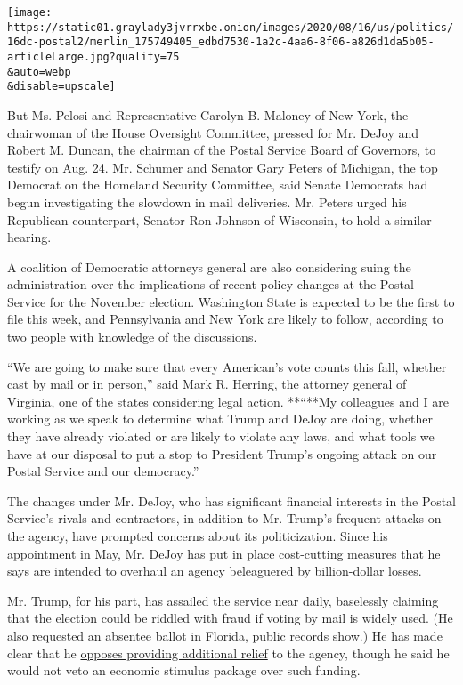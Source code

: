 \texttt{[image: https://static01.graylady3jvrrxbe.onion/images/2020/08/16/us/politics/16dc-postal2/merlin\_175749405\_edbd7530-1a2c-4aa6-8f06-a826d1da5b05-articleLarge.jpg?quality=75\\\&auto=webp\\\&disable=upscale]}

But Ms. Pelosi and Representative Carolyn B. Maloney of New York, the
chairwoman of the House Oversight Committee, pressed for Mr. DeJoy and
Robert M. Duncan, the chairman of the Postal Service Board of Governors,
to testify on Aug. 24. Mr. Schumer and Senator Gary Peters of Michigan,
the top Democrat on the Homeland Security Committee, said Senate
Democrats had begun investigating the slowdown in mail deliveries. Mr.
Peters urged his Republican counterpart, Senator Ron Johnson of
Wisconsin, to hold a similar hearing.

A coalition of Democratic attorneys general are also considering suing
the administration over the implications of recent policy changes at the
Postal Service for the November election. Washington State is expected
to be the first to file this week, and Pennsylvania and New York are
likely to follow, according to two people with knowledge of the
discussions.

``We are going to make sure that every American's vote counts this fall,
whether cast by mail or in person,'' said Mark R. Herring, the attorney
general of Virginia, one of the states considering legal action.
**``**My colleagues and I are working as we speak to determine what
Trump and DeJoy are doing, whether they have already violated or are
likely to violate any laws, and what tools we have at our disposal to
put a stop to President Trump's ongoing attack on our Postal Service and
our democracy.''

The changes under Mr. DeJoy, who has significant financial interests in
the Postal Service's rivals and contractors, in addition to Mr. Trump's
frequent attacks on the agency, have prompted concerns about its
politicization. Since his appointment in May, Mr. DeJoy has put in place
cost-cutting measures that he says are intended to overhaul an agency
beleaguered by billion-dollar losses.

Mr. Trump, for his part, has assailed the service near daily, baselessly
claiming that the election could be riddled with fraud if voting by mail
is widely used. (He also requested an absentee ballot in Florida, public
records show.) He has made clear that he
\href{https://www.nytimes3xbfgragh.onion/2020/08/13/us/politics/trump-postal-service-mail-voting.html}{opposes
providing additional relief} to the agency, though he said he would not
veto an economic stimulus package over such funding.

